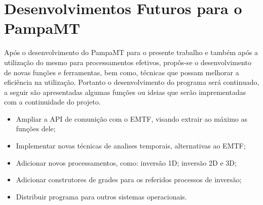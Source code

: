     
    \section{Desenvolvimentos Futuros para o PampaMT}
        
        Após o desenvolvimento do PampaMT para o presente trabalho e também após a utilização do mesmo para processamentos efetivos, propôs-se o desenvolvimento de novas funções e ferramentas, bem como, técnicas que possam melhorar a eficiência na utilização. Portanto o desenvolvimento do programa será continuado, a seguir são apresentadas algumas funções ou ideias que serão imprementadas com a continuidade do projeto.
        
        \begin{itemize}
         \item Ampliar a API de comunição com o EMTF, visando extrair ao máximo as funções dele;
         \item Implementar novas técnicas de analises temporais, alternativas ao EMTF;
         \item Adicionar novos processamentos, como: inversão 1D; inversão 2D e 3D;
         \item Adicionar construtores de grades para os referidos processos de inversão;
         \item Distribuir programa para outros sistemas operacionais.
        \end{itemize}
